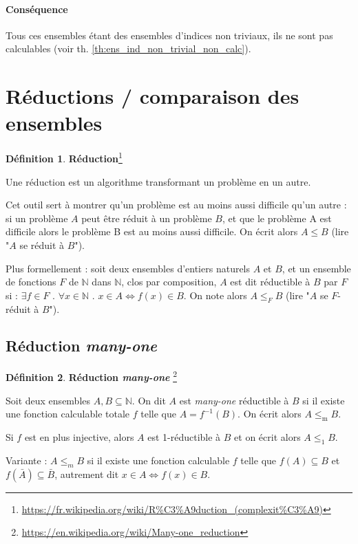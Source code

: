 \documentclass{book}
\theoremstyle{definition}
\newtheorem{definition}{Définition}
\numberwithin{lemma}{subsection}
\numberwithin{theorem}{subsection}
\numberwithin{definition}{subsection}
\numberwithin{proposition}{subsection}
\numberwithin{corollary}{subsection}
\numberwithin{property}{subsection}
\numberwithin{example}{subsection}
\numberwithin{heuristique}{subsection}
\numberwithin{scenario}{subsection}
\begin{document}
            \paragraph{Conséquence} Tous ces ensembles étant des ensembles d'indices non triviaux, ils ne sont pas calculables (voir th. \ref{th:ens_ind_non_trivial_non_calc}).
    
    \section{Réductions / comparaison des ensembles}
        \begin{definition}\textbf{Réduction}\footnote{\url{https://fr.wikipedia.org/wiki/R\%C3\%A9duction\_(complexit\%C3\%A9)}}
            \par Une réduction est un algorithme transformant un problème en un autre.
            \par Cet outil sert à montrer qu'un problème est au moins aussi difficile qu'un autre : si un problème $A$ peut être réduit à un problème $B$, et que le problème A est difficile alors le problème B est au moins aussi difficile. On écrit alors $A \leq B$ (lire "$A$ se réduit à $B$"). 
            \par Plus formellement : soit deux ensembles d'entiers naturels $A$ et $B$, et un ensemble de fonctions $F$ de $\mathbb{N}$ dans $\mathbb{N}$, clos par composition, $A$ est dit réductible à $B$ par $F$ si : $\exists f \in F \mbox{ . } \forall x \in \mathbb{N} \mbox{ . } x \in A \Leftrightarrow f(x) \in B$. On note alors $A \leq_{F} B$ (lire "$A$ se $F$-réduit à $B$").
        \end{definition}
    
        \subsection{Réduction \textit{many-one}}
        
            \begin{definition}\textbf{Réduction \textit{many-one}}
            \footnote{\url{https://en.wikipedia.org/wiki/Many-one\_reduction}}\label{def:reduction_many-one}
                \par Soit deux ensembles $A,B \subseteq \mathbb{N}$. On dit $A$ est \textit{many-one} réductible à $B$ si il existe une fonction calculable totale $f$ telle que $A = f^{-1}(B)$. On écrit alors $A \leq_{\mathrm{m}} B$.
                \par Si $f$ est en plus injective, alors $A$ est 1-réductible à $B$ et on écrit alors $A \leq_1 B$.
                \par Variante : $A \leq_m B$ si il existe une fonction calculable $f$ telle que $f(A) \subseteq B$ et $f(\bar{A}) \subseteq \bar{B}$, autrement dit $x \in A \Leftrightarrow f(x) \in B$.
            \end{definition}
            
\end{document}
